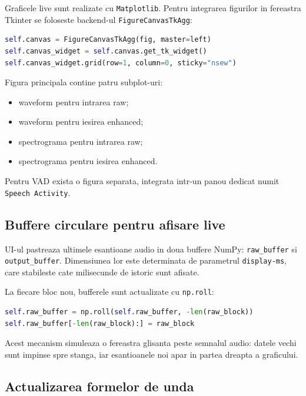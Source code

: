 \documentclass[12pt,a4paper]{article}
\begin{document}
Graficele live sunt realizate cu \texttt{Matplotlib}. Pentru integrarea figurilor
in fereastra Tkinter se foloseste backend-ul \texttt{FigureCanvasTkAgg}:

\begin{lstlisting}[language=Python]
self.canvas = FigureCanvasTkAgg(fig, master=left)
self.canvas_widget = self.canvas.get_tk_widget()
self.canvas_widget.grid(row=1, column=0, sticky="nsew")
\end{lstlisting}

Figura principala contine patru subplot-uri:

\begin{itemize}
    \item waveform pentru intrarea raw;
    \item waveform pentru iesirea enhanced;
    \item spectrograma pentru intrarea raw;
    \item spectrograma pentru iesirea enhanced.
\end{itemize}

Pentru VAD exista o figura separata, integrata intr-un panou dedicat numit
\texttt{Speech Activity}.

\subsection{Buffere circulare pentru afisare live}

UI-ul pastreaza ultimele esantioane audio in doua buffere NumPy:
\texttt{raw\_buffer} si \texttt{output\_buffer}. Dimensiunea lor este determinata
de parametrul \texttt{display-ms}, care stabileste cate milisecunde de istoric
sunt afisate.

La fiecare bloc nou, bufferele sunt actualizate cu \texttt{np.roll}:

\begin{lstlisting}[language=Python]
self.raw_buffer = np.roll(self.raw_buffer, -len(raw_block))
self.raw_buffer[-len(raw_block):] = raw_block
\end{lstlisting}

Acest mecanism simuleaza o fereastra glisanta peste semnalul audio: datele vechi
sunt impinse spre stanga, iar esantioanele noi apar in partea dreapta a graficului.

\subsection{Actualizarea formelor de unda}
\end{document}

